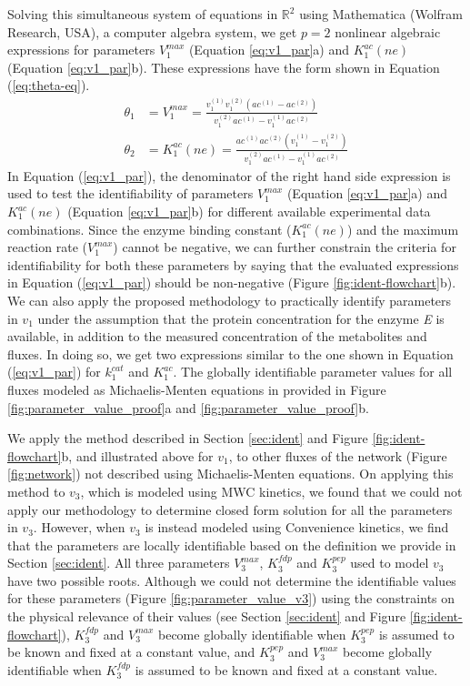 \documentclass[10pt]{article}
\begin{document}
	Solving this simultaneous system of equations in $\mathbb{R}^2$ using Mathematica (Wolfram Research, USA), a computer algebra system, we get $p=2$ nonlinear algebraic expressions for parameters $V_1^{max}$ (Equation \ref{eq:v1_par}a) and $K_1^{ac}(ne)$ (Equation \ref{eq:v1_par}b). These expressions have the form shown in Equation (\ref{eq:theta-eq}).
	\begin{subequations}\label{eq:v1_par}
		\begin{align}		
		\theta_1 &= V_1^{max} = \frac{v_1^{(1)}v_1^{(2)}(ac^{(1)}-ac^{(2)})}{v_1^{(2)}ac^{(1)}-v_1^{(1)}ac^{(2)}}\\
		\theta_2 &= K_1^{ac}(ne) = \frac{ac^{(1)}ac^{(2)}(v_1^{(1)}-v_1^{(2)})}{v_1^{(2)}ac^{(1)}-v_1^{(1)}ac^{(2)}}
		\end{align}
	\end{subequations}
	In Equation (\ref{eq:v1_par}), the denominator of the right hand side expression is used to test the identifiability of parameters $V_1^{max}$ (Equation \ref{eq:v1_par}a) and $K_1^{ac}(ne)$ (Equation \ref{eq:v1_par}b) for different available experimental data combinations. Since the enzyme binding constant ($K_1^{ac}(ne)$) and the maximum reaction rate ($V_1^{max}$) cannot be negative, we can further constrain the criteria for identifiability for both these parameters by saying that the evaluated expressions in Equation (\ref{eq:v1_par}) should be non-negative (Figure \ref{fig:ident-flowchart}b). 
	We can also apply the proposed methodology to practically identify parameters in $v_1$ under the assumption that the protein concentration for the enzyme \textit{E} is available, in addition to the measured concentration of the metabolites and fluxes. In doing so, we get two expressions similar to the one shown in Equation (\ref{eq:v1_par}) for $k_1^{cat}$ and $K_1^{ac}$. The globally identifiable parameter values for all fluxes modeled as Michaelis-Menten equations in provided in Figure \ref{fig:parameter_value_proof}a and \ref{fig:parameter_value_proof}b. 	
	
	We apply the method described in Section \ref{sec:ident} and Figure \ref{fig:ident-flowchart}b, and illustrated above for $v_1$, to other fluxes of the network (Figure \ref{fig:network}) not described using Michaelis-Menten equations. On applying this method to $v_3$, which is modeled using MWC kinetics, we found that we could not apply our methodology to determine closed form solution for all the parameters in $v_3$. However, when $v_3$ is instead modeled using Convenience kinetics, we find that the parameters are locally identifiable based on the definition we provide in Section \ref{sec:ident}. All three parameters $V_3^{max}$, $K_3^{fdp}$ and $K_3^{pep}$ used to model $v_3$ have two possible roots. Although we could not determine the identifiable values for these parameters (Figure \ref{fig:parameter_value_v3}) using the constraints on the physical relevance of their values (see Section \ref{sec:ident} and Figure \ref{fig:ident-flowchart}), $K_3^{fdp}$ and $V_3^{max}$ become globally identifiable when $K_3^{pep}$ is assumed to be known and fixed at a constant value, and $K_3^{pep}$ and $V_3^{max}$ become globally identifiable when $K_3^{fdp}$ is assumed to be known and fixed at a constant value.
	
\end{document}
